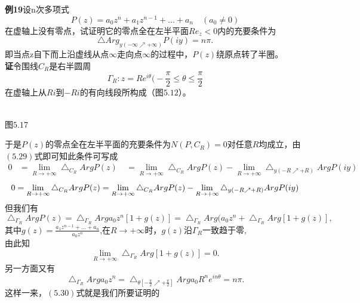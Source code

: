 \documentclass{report}
\begin{document}
\qquad \textbf{例19}\qquad 设n次多项式\\
$$P(z)=a_{0}z^{n}+a_{1}z^{n-1}+ ...  + a_{n}\quad(a_{0}\neq 0)$$
在虚轴上没有零点，试证明它的零点全在左半平面$Re_{z}<0$内的充要条件为
$$\bigtriangleup Arg_{y(-\infty\nearrow+\infty)}P(iy)=n\pi.$$
即当点z自下而上沿虚线从点$\infty$走向点$\infty$的过程中，$P(z)$绕原点转了半圈。\\
\qquad \textbf{证}\qquad 令围线$C_{R}$是右半圆周
$$\Gamma_{R}:z=Re^{i\theta} \big(-\frac{\pi}{2}\leq\theta\leq\frac{\pi}{2}$$
在虚轴上从$Ri$到$-Ri$的有向线段所构成（图$5.12$）。
\begin{center}
\\
图$5.17$
\end{center}
\qquad 于是$P(z)$的零点全在左半平面的充要条件为$N(P,C_{R})=0$对任意$R$均成立，由$(5.29)$式即可知此条件可写成
\begin{equation}
\begin{aligned}
0&=\lim_{R\rightarrow+\infty}\bigtriangleup_{C_{R}}ArgP(z) \
&=\lim_{R\rightarrow+\infty}\bigtriangleup_{C_{R}}ArgP(z)-\lim_{R\rightarrow+\infty}\bigtriangleup_{y(-R\nearrow+R)}ArgP(iy)
\end{aligned}
\end{equation}
$$0=\lim_{R\rightarrow+\infty}\bigtriangleup_{C_{R}}ArgP(z)\newline
=\lim_{R\rightarrow+\infty}\bigtriangleup_{C_{R}}ArgP(z)-\lim_{R\rightarrow+\infty}\bigtriangleup_{y(-R\nearrow+R)}ArgP(iy)$$
但我们有
$$\bigtriangleup_{\Gamma_{R}}ArgP(z)=\bigtriangleup_{\Gamma_{R}}Arg{a_{0}z^{n}[1+g(z)]}=\bigtriangleup_{\Gamma_{R}}Arg(a_{0}z^{n}+\bigtriangleup_{\Gamma_{R}}Arg[1+g(z)],$$
其中$g(z)=\frac{a_{1}z^{n-1}+ ... +a_{n}}{a_{0}z^{n}}$,在$R\rightarrow+\infty$时，$g(z)$沿$\Gamma_{R}$一致趋于零,\\
\qquad 由此知
$$\lim_{R\rightarrow+\infty}\bigtriangleup_{\Gamma_{R}}Arg[1+g(z)]=0.$$
另一方面又有
$$\bigtriangleup_{\Gamma_{R}}Arga_{0}z^{n}=\bigtriangleup_{\theta[-\frac{\pi}{2}\nearrow+\frac{\pi}{2}]}Arga_{0}R^{n}e^{in\theta}=n\pi.$$
这样一来，$(5.30)$式就是我们所要证明的
\end{document}
